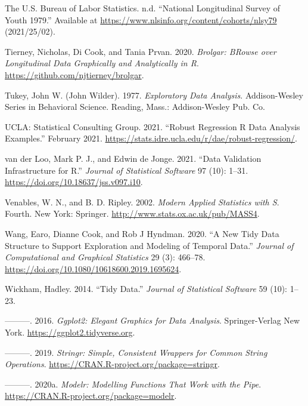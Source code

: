 \documentclass{article}
\begin{document}
\leavevmode\hypertarget{ref-nlsy79}{}%
The U.S. Bureau of Labor Statistics. n.d. ``National Longitudinal Survey of Youth 1979.'' Available at \url{https://www.nlsinfo.org/content/cohorts/nlsy79} (2021/25/02).

\leavevmode\hypertarget{ref-brolgar}{}%
Tierney, Nicholas, Di Cook, and Tania Prvan. 2020. \emph{Brolgar: BRowse over Longitudinal Data Graphically and Analytically in R}. \url{https://github.com/njtierney/brolgar}.

\leavevmode\hypertarget{ref-tukey}{}%
Tukey, John W. (John Wilder). 1977. \emph{Exploratory Data Analysis}. Addison-Wesley Series in Behavioral Science. Reading, Mass.: Addison-Wesley Pub. Co.

\leavevmode\hypertarget{ref-rlm}{}%
UCLA: Statistical Consulting Group. 2021. ``Robust Regression \textbar{} R Data Analysis Examples.'' February 2021. \url{https://stats.idre.ucla.edu/r/dae/robust-regression/}.

\leavevmode\hypertarget{ref-validate}{}%
van der Loo, Mark P. J., and Edwin de Jonge. 2021. ``Data Validation Infrastructure for R.'' \emph{Journal of Statistical Software} 97 (10): 1--31. \url{https://doi.org/10.18637/jss.v097.i10}.

\leavevmode\hypertarget{ref-mass}{}%
Venables, W. N., and B. D. Ripley. 2002. \emph{Modern Applied Statistics with S}. Fourth. New York: Springer. \url{http://www.stats.ox.ac.uk/pub/MASS4}.

\leavevmode\hypertarget{ref-tsibble}{}%
Wang, Earo, Dianne Cook, and Rob J Hyndman. 2020. ``A New Tidy Data Structure to Support Exploration and Modeling of Temporal Data.'' \emph{Journal of Computational and Graphical Statistics} 29 (3): 466--78. \url{https://doi.org/10.1080/10618600.2019.1695624}.

\leavevmode\hypertarget{ref-WickhamHadley2014TD}{}%
Wickham, Hadley. 2014. ``Tidy Data.'' \emph{Journal of Statistical Software} 59 (10): 1--23.

\leavevmode\hypertarget{ref-ggplot2}{}%
---------. 2016. \emph{Ggplot2: Elegant Graphics for Data Analysis}. Springer-Verlag New York. \url{https://ggplot2.tidyverse.org}.

\leavevmode\hypertarget{ref-stringr}{}%
---------. 2019. \emph{Stringr: Simple, Consistent Wrappers for Common String Operations}. \url{https://CRAN.R-project.org/package=stringr}.

\leavevmode\hypertarget{ref-modelr}{}%
---------. 2020a. \emph{Modelr: Modelling Functions That Work with the Pipe}. \url{https://CRAN.R-project.org/package=modelr}.
\end{document}
